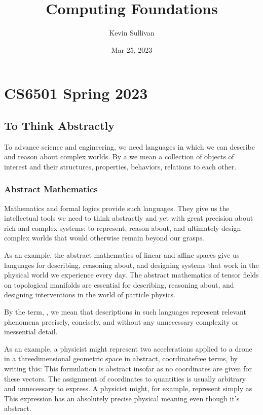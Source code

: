 \documentclass[letterpaper,10pt,english]{sphinxmanual}
\title{Computing Foundations}
\date{Mar 25, 2023}
\author{Kevin Sullivan}
\begin{document}
\pagestyle{empty}
\sphinxmaketitle
\pagestyle{plain}
\sphinxtableofcontents
\pagestyle{normal}
\label{\detokenize{index::doc}}


\sphinxstepscope


\chapter{CS6501 Spring 2023}
\label{\detokenize{A_00_Introduction:cs6501-spring-2023}}\label{\detokenize{A_00_Introduction:introduction}}\label{\detokenize{A_00_Introduction::doc}}

\section{To Think Abstractly}
\label{\detokenize{A_00_Introduction:to-think-abstractly}}
\sphinxAtStartPar
To advance science and engineering, we need languages in
which we can describe and reason about complex worlds. By
a  we mean a collection of objects of interest and
their structures, properties, behaviors, relations to each
other.


\subsection{Abstract Mathematics}
\label{\detokenize{A_00_Introduction:abstract-mathematics}}
\sphinxAtStartPar
Mathematics and formal logics provide such languages. They
give us the intellectual tools we need to think abstractly
and yet with great precision about rich and complex systems:
to represent, reason about, and ultimately design complex
worlds that would otherwise remain beyond our grasps.

\sphinxAtStartPar
As an example, the abstract mathematics of linear and affine
spaces give us languages for describing, reasoning about, and
designing systems that work in the  physical world
we experience every day. The abstract mathematics of tensor
fields on topological manifolds are essential for describing,
reasoning about, and designing interventions in the 
world of particle physics.

\sphinxAtStartPar
By the term, , we mean that descriptions in such
languages represent relevant phenomena precisely, concisely,
and without any unnecessary complexity or inessential detail.

\sphinxAtStartPar
As an example, a physicist might represent two accelerations
applied to a drone in a three\sphinxhyphen{}dimensional geometric space in
abstract, coordinate\sphinxhyphen{}free terms, by writing this:  This formulation is abstract
insofar as no coordinates are given for these vectors. The
assignment of coordinates to  quantities is usually
arbitrary and unnecessary to express. A physicist might, for
example, represent  simply as
 This expression has an absolutely precise physical
meaning even though it’s abstract.
\end{document}
